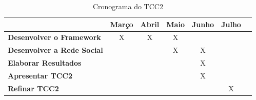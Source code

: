 \begin{table}[h]
\centering
\caption{Cronograma do TCC2}
\label{cronograma tcc2}
\begin{tabular}{|l|c|c|c|c|c|c|}
\hline
                                      			& \multicolumn{1}{l|}{\textbf{Março}} & \multicolumn{1}{l|}{\textbf{Abril}} & \multicolumn{1}{l|}{\textbf{Maio}} & \multicolumn{1}{l|}{\textbf{Junho}} & \multicolumn{1}{l|}{\textbf{Julho}} \\ \hline
\textbf{Desenvolver o Framework}                & X                           		  & X                              		& X                            		 &                               	   &                               		 \\ \hline
\textbf{Desenvolver a Rede Social}              &                            		  &                               		& X                            		 & X                              	   &                               		 \\ \hline
\textbf{Elaborar Resultados}				    &                            		  &                              		&                             		 & X                             	   &                               		 \\ \hline
\textbf{Apresentar TCC2}						&                             		  &                              		&                             		 & X                              	   &                               		 \\ \hline
\textbf{Refinar TCC2}				            &                             		  &                               		&                             		 &                               	   & X                             		 \\ \hline
\end{tabular}
\end{table}
